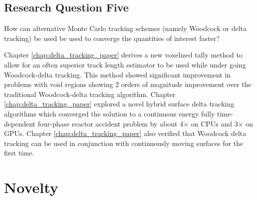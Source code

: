 \subsection{Research Question Five}

\begin{displayquote}
How can alternative Monte Carlo tracking schemes (namely Woodcock or delta tracking) be used be used to converge the quantities of interest faster?
\end{displayquote}
Chapter \ref{chap:delta_tracking_paper} derives a new voxelized tally method to allow for an often superior track length estimator to be used while under going Woodcock-delta tracking.
This method showed significant improvement in problems with void regions showing 2 orders of magnitude improvement over the traditional Woodcock-delta tracking algorithm.
Chapter \ref{chap:delta_tracking_paper} explored a novel hybrid surface delta tracking algorithms which converged the solution to a continuous energy fully time-dependent four-phase reactor accident problem by about 4$\times$ on CPUs and 3$\times$ on GPUs.
Chapter \ref{chap:delta_tracking_paper} also verified that Woodcock delta tracking can be used in conjunction with continuously moving surfaces for the first time.


\section{Novelty}

